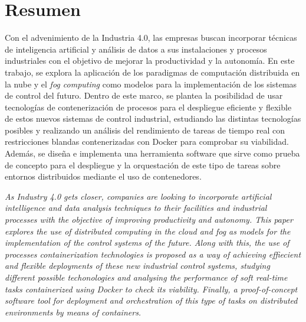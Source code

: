 
\chapter*{Resumen}

Con el advenimiento de la Industria 4.0, las empresas buscan incorporar técnicas
de inteligencia artificial y análisis de datos a sus instalaciones y procesos
industriales con el objetivo de mejorar la productividad y la autonomía. En este
trabajo, se explora la aplicación de los paradigmas de computación distribuida
en la nube y el \textit{fog computing} como modelos para la implementación de
los sistemas de control del futuro. Dentro de este marco, se plantea la
posibilidad de usar tecnologías de contenerización de procesos para el
despliegue eficiente y flexible de estos nuevos sistemas de control industrial,
estudiando las distintas tecnologías posibles y realizando un análisis del
rendimiento de tareas de tiempo real con restricciones blandas contenerizadas
con Docker para comprobar su viabilidad. Además, se diseña e implementa una
herramienta software que sirve como prueba de concepto para el despliegue y la
orquestación de este tipo de tareas sobre entornos distribuidos mediante el uso
de contenedores.

\textit{As Industry 4.0 gets closer, companies are looking to incorporate
    artificial intelligence and data analysis techniques to their facilities and
    industrial processes with the objective of improving productivity and
    autonomy. This paper explores the use of distributed computing in the cloud
    and fog as models for the implementation of the control systems of the
    future. Along with this, the use of processes containerization technologies
    is proposed as a way of achieving effiecient and flexible deployments of
    these new industrial control systems, studying different possible
    techonologies and analysing the performance of soft real-time tasks
    containerized using Docker to check its viability. Finally, a
    proof-of-concept software tool for deployment and orchestration of this type
    of tasks on distributed environments by means of containers.}


\cleardoublepage